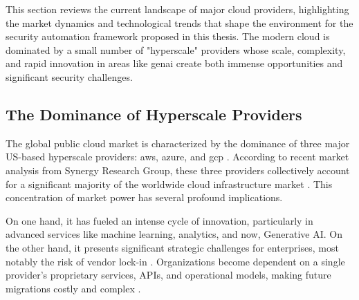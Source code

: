 This section reviews the current landscape of major cloud providers, highlighting the market dynamics and technological trends that shape the environment for the security automation framework proposed in this thesis. The modern cloud is dominated by a small number of "\gls{hyperscale}" providers whose scale, complexity, and rapid innovation in areas like \gls{genai} create both immense opportunities and significant security challenges.

\subsection{The Dominance of Hyperscale Providers}
The global public cloud market is characterized by the dominance of three major US-based \gls{hyperscale} providers: \gls{aws}, \gls{azure}, and \gls{gcp} \cite{n_koritala_cloud-first_2025}. According to recent market analysis from Synergy Research Group, these three providers collectively account for a significant majority of the worldwide cloud infrastructure market \cite{noauthor_european_nodate}. This concentration of market power has several profound implications.

On one hand, it has fueled an intense cycle of innovation, particularly in advanced services like machine learning, analytics, and now, Generative AI. On the other hand, it presents significant strategic challenges for enterprises, most notably the risk of vendor lock-in \cite{patel_comparative_nodate}. Organizations become dependent on a single provider’s proprietary services, APIs, and operational models, making future migrations costly and complex \cite{n_koritala_cloud-first_2025}.

